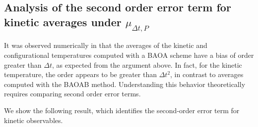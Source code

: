 \subsection{Analysis of the second order error term for kinetic averages under $\mu_{\Delta t,P}$}\label{BAOA kinetic second order estimate}
It was observed numerically in \cite{KK22} that the averages of the kinetic and configurational temperatures computed with a BAOA scheme have a bias of order greater than $\Delta t$, as expected from the argument above.
In fact, for the kinetic temperature, the order appears to  be greater than $\Delta t^2$, in contrast to averages computed with the BAOAB method.
Understanding this behavior theoretically requires comparing second order error terms.

We show the following result, which identifies the second-order error term for kinetic observables.

